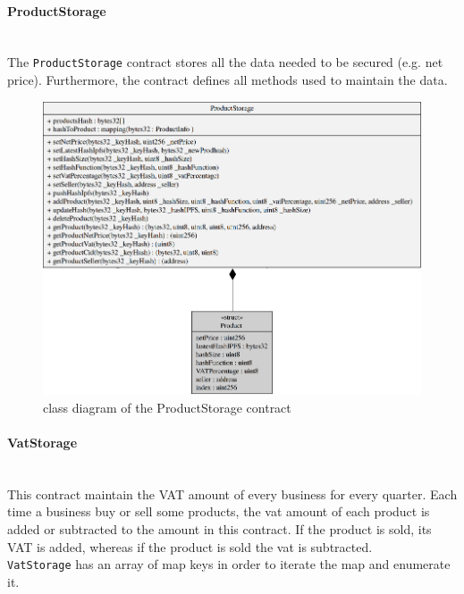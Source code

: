 \paragraph{ProductStorage}\mbox{}\\

\noindent The \texttt{ProductStorage} contract stores all the data needed to be secured (e.g. net price). Furthermore, the contract defines all methods used to maintain the data. 
\begin{figure}[H]
	\centering
	\includegraphics[scale=0.45]{res/images/solidity/productstorage.png}
	\caption{class diagram of the ProductStorage contract}
\end{figure}
\pagebreak
\paragraph{VatStorage}\mbox{}\\
This contract maintain the VAT amount of every business for every quarter. Each time a business buy or sell some products, the vat amount of each product is added or subtracted to the amount in this contract. If the product is sold, its VAT is added, whereas if the product is sold the vat is subtracted. \\
\texttt{VatStorage} has an array of map keys in order to iterate the map and enumerate it.

